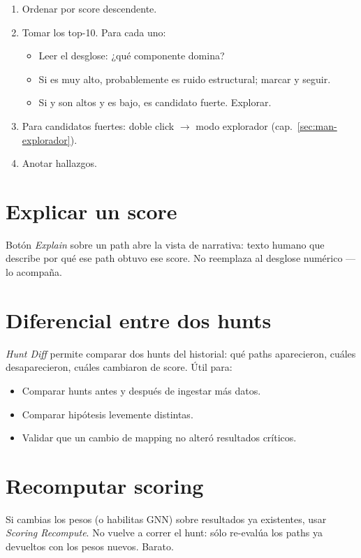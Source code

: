 \begin{enumerate}
    \item Ordenar por score descendente.
    \item Tomar los top-10. Para cada uno:
    \begin{itemize}
        \item Leer el desglose: ¿qué componente domina?
        \item Si  es muy alto,
        probablemente es ruido estructural; marcar y seguir.
        \item Si  y  son
        altos y  es bajo, es
        candidato fuerte. Explorar.
    \end{itemize}
    \item Para candidatos fuertes: doble click $\to$ modo
    explorador (cap.~\ref{sec:man-explorador}).
    \item Anotar hallazgos.
\end{enumerate}

\section{Explicar un score}

Botón \emph{Explain} sobre un path abre la vista de narrativa:
texto humano que describe por qué ese path obtuvo ese score. No
reemplaza al desglose numérico — lo acompaña.

\section{Diferencial entre dos hunts}

\emph{Hunt \textrightarrow{} Diff} permite comparar dos hunts del
historial: qué paths aparecieron, cuáles desaparecieron, cuáles
cambiaron de score. Útil para:

\begin{itemize}
    \item Comparar hunts antes y después de ingestar más datos.
    \item Comparar hipótesis levemente distintas.
    \item Validar que un cambio de mapping no alteró resultados
    críticos.
\end{itemize}

\section{Recomputar scoring}

Si cambias los pesos (o habilitas GNN) sobre resultados ya
existentes, usar \emph{Scoring \textrightarrow{} Recompute}. No
vuelve a correr el hunt: sólo re-evalúa los paths ya devueltos con
los pesos nuevos. Barato.
